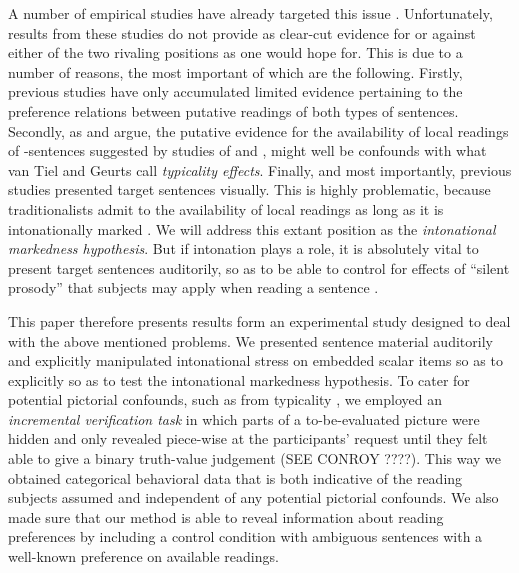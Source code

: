 \documentclass[fleqn,reqno,10pt,draft]{article}
\newcommand{\as}{\acro{as}}
\begin{document}
A number of empirical studies have already targeted this issue
\citep[e.g.][]{GeurtsPouscoulous2009:Embedded-Implic,CliftonDube2010:Embedded-Implic,ChemlaSpector2010:Experimental-Ev}. Unfortunately,
results from these studies do not provide as clear-cut evidence for or
against either of the two rivaling positions as one would hope
for. This is due to a number of reasons, the most important of which
are the following. Firstly, previous studies have only accumulated
limited evidence pertaining to the preference relations between
putative readings of both types of sentences. Secondly, as
\citet{Tielvan-Tiel2012:Embedded-Scalar} and
\citet{GeurtsTielvan-Tiel2013:Scalar-expressi} argue, the putative
evidence for the availability of local readings of \as-sentences
suggested by studies of \citet{CliftonDube2010:Embedded-Implic} and
\citet{ChemlaSpector2010:Experimental-Ev}, might well be confounds
with what van Tiel and Geurts call \emph{typicality effects}. Finally,
and most importantly, previous studies presented target sentences
visually. This is highly problematic, because traditionalists admit to
the availability of local readings as long as it is intonationally
marked
\citep[e.g.][]{Horn2006:The-Border-Wars,Geurts2009:Scalar-Implicat,ChemlaSpector2010:Experimental-Ev,Geurts2010:Quantity-Implic,Tielvan-Tiel2012:Embedded-Scalar,GeurtsTielvan-Tiel2013:Scalar-expressi}. We
will address this extant position as the \emph{intonational markedness
  hypothesis}. But if intonation plays a role, it is absolutely vital
to present target sentences auditorily, so as to be able to control
for effects of ``silent prosody'' that subjects may apply when reading
a sentence \citep[see][]{Bader98,Fodor98}.

This paper therefore presents results form an experimental study
designed to deal with the above mentioned problems. We presented
sentence material auditorily and explicitly manipulated intonational
stress on embedded scalar items so as to explicitly so as to test the
intonational markedness hypothesis. To cater for potential pictorial
confounds, such as from typicality
\citep{Tielvan-Tiel2012:Embedded-Scalar,GeurtsTielvan-Tiel2013:Scalar-expressi},
we employed an \emph{incremental verification task} in which parts of
a to-be-evaluated picture were hidden and only revealed piece-wise at
the participants' request until they felt able to give a binary
truth-value judgement (SEE CONROY ????). This way we obtained
categorical behavioral data that is both indicative of the reading
subjects assumed and independent of any potential pictorial
confounds. We also made sure that our method is able to reveal
information about reading preferences by including a control condition
with ambiguous sentences with a well-known preference on available
readings.
\end{document}
